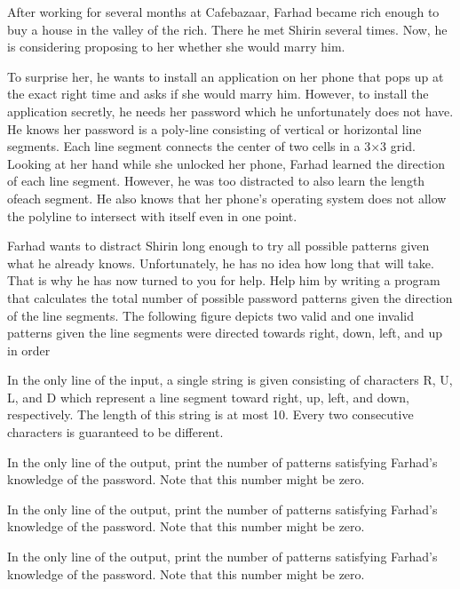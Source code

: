 

After working for several months at Cafebazaar, Farhad became rich enough to buy a house in the valley 
of the rich. There he met Shirin several times. Now, he is considering proposing to her whether she 
would marry him. 

To surprise her, he wants to install an application on her phone that pops up at the 
exact right time and asks if she would marry him.
However, to install the application secretly, he needs her password which he unfortunately does not 
have. He knows her password is a poly-line consisting of vertical or horizontal line segments. Each line 
segment connects the center of two cells in a 3×3 grid. Looking at her hand while she unlocked her 
phone, Farhad learned the direction of each line segment. However, he was too distracted to also learn 
the length ofeach segment. He also knows that her phone’s operating system does not allow the polyline to intersect with itself even in one point.


Farhad wants to distract Shirin long enough to try all possible patterns given what he already knows. 
Unfortunately, he has no idea how long that will take. That is why he has now turned to you for help. 
Help him by writing a program that calculates the total number of possible password patterns given the 
direction of the line segments. The following figure depicts two valid and one invalid patterns given the 
line segments were directed towards right, down, left, and up in order


In the only line of the input, a single string is given consisting of characters R, U, L, and D which 
represent a line segment toward right, up, left, and down, respectively. The length of this string is at 
most 10. Every two consecutive characters is guaranteed to be different.


In the only line of the output, print the number of patterns satisfying Farhad’s knowledge of the 
password. Note that this number might be zero.



In the only line of the output, print the number of patterns satisfying Farhad’s knowledge of the 
password. Note that this number might be zero.



In the only line of the output, print the number of patterns satisfying Farhad’s knowledge of the 
password. Note that this number might be zero.
